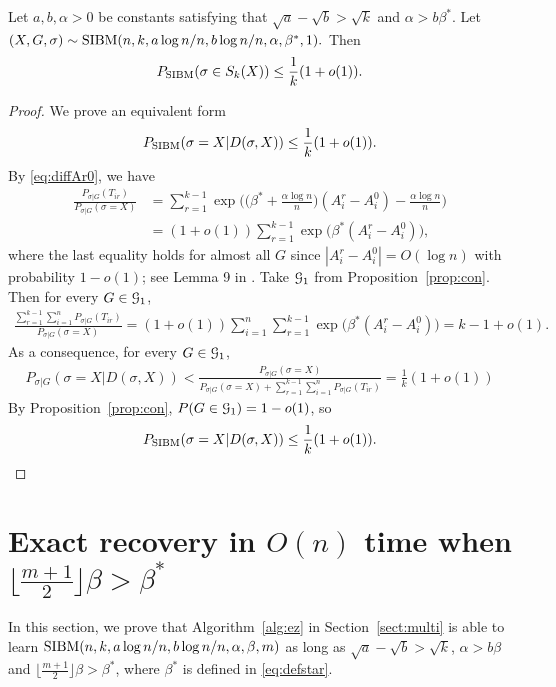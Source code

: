 \documentclass{article}
\begin{document}
\begin{proposition}  \label{prop:zj}
	Let $a,b,\alpha> 0$ be constants satisfying that $\sqrt{a}-\sqrt{b} > \sqrt{k}$ and $\alpha>b\beta^\ast$. Let 
	$
	(X,G,\sigma) \sim \operatorname{SIBM}(n,k, a\log n/n, b\log n/n,\alpha,\beta^\ast, 1) .
	$
	Then 
	$$
	P_{\operatorname{SIBM}}(\sigma \in S_k(X)) \le \frac{1}{k}(1+o(1)) .
	$$
\end{proposition}
\begin{proof}
	We prove an equivalent form
	$$
	P_{\operatorname{SIBM}}(\sigma = X | D(\sigma, X)) \le \frac{1}{k}(1+o(1)) .
	$$
	By \eqref{eq:diffAr0}, we have
	\begin{align*}
	\frac{P_{\sigma|G}(T_{ir})}
	{P_{\sigma|G}(\sigma=X)}
	& = \sum_{r=1}^{k-1}\exp\Big(\big(\beta^\ast+\frac{\alpha\log n}{n} \big) (A^r_i-A^0_i)
	-\frac{\alpha\log n}{n} \Big) \\
	& = (1+o(1))\sum_{r=1}^{k-1} \exp\big(\beta^\ast (A^r_i-A^0_i) \big)  ,
	\end{align*}
	where the last equality holds for almost all $G$ since $|A^r_i-A^0_i|=O(\log n)$ with probability $1-o(1)$; see Lemma 9 in \cite{ye2020exact}.
	Take $\mathcal{G}_{1}$ from Proposition~\ref{prop:con}. Then for every $G\in\mathcal{G}_{1}$,
	\begin{align*}
	\frac{\sum_{r=1}^{k-1}\sum_{i=1}^n P_{\sigma|G}(T_{ir} )}
	{P_{\sigma|G}(\sigma=X)}  = (1+o(1)) \sum_{i=1}^n \sum_{r=1}^{k-1}\exp\big(\beta^\ast (A^r_i-A^0_i) \big)  =k-1+o(1) .
	\end{align*}
	As a consequence, for every $G\in\mathcal{G}_{1}$,
	\begin{align*}
	P_{\sigma|G} (\sigma= X | D(\sigma, X) ) <
	\frac {P_{\sigma|G}(\sigma=X)}
	{P_{\sigma|G}(\sigma=X)+\sum_{r=1}^{k-1}\sum_{i=1}^n P_{\sigma|G}(T_{ir})}
	=\frac{1}{k} (1+o(1))
	\end{align*}
	By Proposition~\ref{prop:con}, $P(G\in\mathcal{G}_{1})=1-o(1)$, so
	$$
	P_{\operatorname{SIBM}}(\sigma= X | D(\sigma, X) ) \le \frac{1}{k}(1+o(1)) .
	$$
\end{proof}
\section{Exact recovery in $O(n)$ time when $\lfloor \frac{m+1}{2} \rfloor \beta>\beta^\ast$}
\label{sect:direct}
In this section, we prove that Algorithm~\ref{alg:ez} in Section~\ref{sect:multi} is able to learn $\SIBM(n,k,a\log n/n, \linebreak[4] b\log n/n,\alpha,\beta, m)$ as long as $\sqrt{a}-\sqrt{b} > \sqrt{k}$,  $\alpha>b\beta$ and $\lfloor \frac{m+1}{2} \rfloor \beta>\beta^\ast$, where $\beta^\ast$ is defined in \eqref{eq:defstar}.
\end{document}
